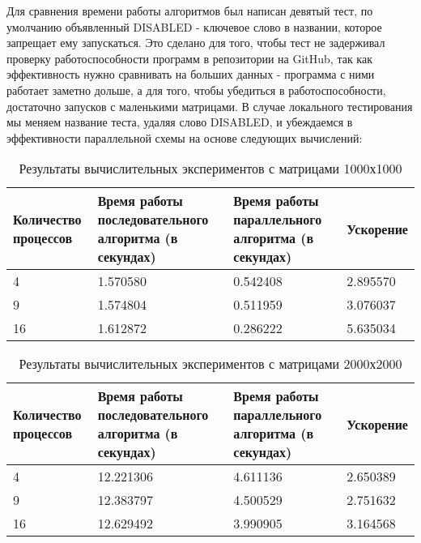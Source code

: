 \documentclass{report}
\begin{document}
\par Для сравнения времени работы алгоритмов был написан девятый тест, по умолчанию объявленный DISABLED - ключевое слово в названии, которое запрещает ему запускаться. Это сделано для того, чтобы тест не задерживал проверку работоспособности программ в репозитории на GitHub, так как эффективность нужно сравнивать на больших данных - программа с ними работает заметно дольше, а для того, чтобы убедиться в работоспособности, достаточно запусков с маленькими матрицами. В случае локального тестирования мы меняем название теста, удаляя слово DISABLED, и убеждаемся в эффективности параллельной схемы на основе следующих вычислений:
\begin{table}[!h]
\caption{Результаты вычислительных экспериментов с матрицами 1000х1000}
\centering
\begin{tabular}{| p{2cm} | p{3cm} | p{4cm} | p{2cm} |}
\hline
Количество процессов & Время работы последовательного алгоритма (в секундах) & Время работы параллельного алгоритма (в секундах) & Ускорение  \\[5pt]
\hline
4        & 1.570580        & 0.542408     & 2.895570       \\
9        & 1.574804        & 0.511959    & 3.076037       \\
16        & 1.612872        & 0.286222     & 5.635034       \\

\hline
\end{tabular}
\end{table}

\begin{table}[!h]
\caption{Результаты вычислительных экспериментов с матрицами 2000х2000}
\centering
\begin{tabular}{| p{2cm} | p{3cm} | p{4cm} | p{2cm} |}
\hline
Количество процессов & Время работы последовательного алгоритма (в секундах) & Время работы параллельного алгоритма (в секундах) & Ускорение  \\[5pt]
\hline
4        & 12.221306        & 4.611136     & 2.650389       \\
9        & 12.383797        & 4.500529     & 2.751632       \\
16        & 12.629492        & 3.990905     & 3.164568       \\

\hline
\end{tabular}
\end{table}

\newpage
\end{document}

